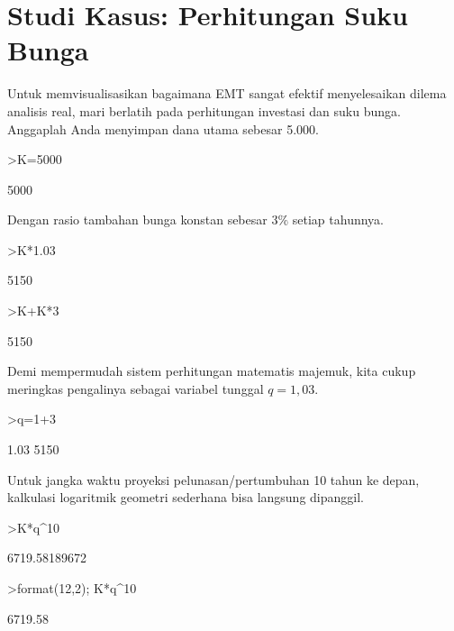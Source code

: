 \documentclass[a4paper,11pt,oneside,enabledeprecatedfontcommands]{scrbook}
\newenvironment{eulernotebook}{}{}
\newcommand{\eulerheading}[1]{\chapter{#1}}
\newenvironment{eulercomment}{\par\medskip\noindent}{\par\medskip}
\begin{document}
\begin{eulernotebook}
\eulerheading{Studi Kasus: Perhitungan Suku Bunga}
\begin{eulercomment}
Untuk memvisualisasikan bagaimana EMT sangat efektif menyelesaikan dilema analisis real, mari berlatih pada perhitungan investasi dan suku bunga. Anggaplah Anda menyimpan dana utama sebesar \textdollar{}5.000.
\end{eulercomment}
\begin{eulerprompt}
>K=5000
\end{eulerprompt}
\begin{euleroutput}
5000
\end{euleroutput}
\begin{eulercomment}
Dengan rasio tambahan bunga konstan sebesar $3\%$ setiap tahunnya.
\end{eulercomment}
\begin{eulerprompt}
>K*1.03
\end{eulerprompt}
\begin{euleroutput}
5150
\end{euleroutput}
\begin{eulerprompt}
>K+K*3%
\end{eulerprompt}
\begin{euleroutput}
5150
\end{euleroutput}
\begin{eulercomment}
Demi mempermudah sistem perhitungan matematis majemuk, kita cukup meringkas pengalinya sebagai variabel tunggal $q = 1{,}03$.
\end{eulercomment}
\begin{eulerprompt}
>q=1+3%
\end{eulerprompt}
\begin{euleroutput}
1.03
5150
\end{euleroutput}
\begin{eulercomment}
Untuk jangka waktu proyeksi pelunasan/pertumbuhan 10 tahun ke depan, kalkulasi logaritmik geometri sederhana bisa langsung dipanggil.
\end{eulercomment}
\begin{eulerprompt}
>K*q^10
\end{eulerprompt}
\begin{euleroutput}
6719.58189672
\end{euleroutput}
\begin{eulerprompt}
>format(12,2); K*q^10
\end{eulerprompt}
\begin{euleroutput}
    6719.58 
\end{euleroutput}

\end{eulernotebook}
\end{document}
